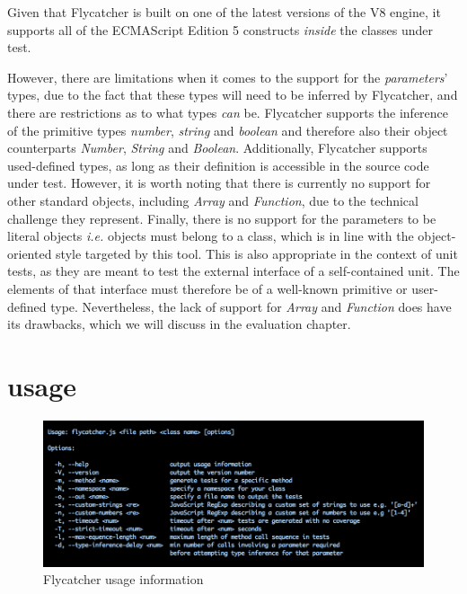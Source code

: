 Given that \textsf{Flycatcher} is built on one of the latest versions of the V8 engine, it supports all of the ECMAScript Edition 5 constructs \emph{inside} the classes under test.

However, there are limitations when it comes to the support for the \emph{parameters}' types, due to the fact that these types will need to be inferred by \textsf{Flycatcher}, and there are restrictions as to what types \emph{can} be. Flycatcher supports the inference of the primitive types \emph{number}, \emph{string} and \emph{boolean} and therefore also their object counterparts \textit{Number}, \textit{String} and \textit{Boolean}. Additionally, \textsf{Flycatcher} supports used-defined types, as long as their definition is accessible in the source code under test. However, it is worth noting that there is currently no support for other standard objects, including \textit{Array} and \textit{Function}, due to the technical challenge they represent. Finally, there is no support for the parameters to be literal objects \emph{i.e.} objects must belong to a class, which is in line with the object-oriented style targeted by this tool. This is also appropriate in the context of unit tests, as they are meant to test the external interface of a self-contained unit. The elements of that interface must therefore be of a well-known primitive or user-defined type. Nevertheless, the lack of support for \textit{Array} and \textit{Function} does have its drawbacks, which we will discuss in the evaluation chapter.

\section{\textsf{} usage}
\label{usagesection}
\begin{figure}[h]
\hspace*{-1.6cm}
\centering
\includegraphics[scale=0.45]{./components/chapter3/usage.png}
\caption{\textsf{Flycatcher} usage information}
\label{usage}
\end{figure}

